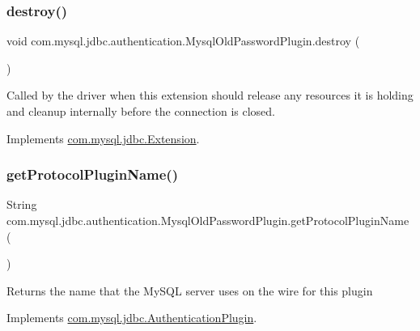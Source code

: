 \subsubsection{\texorpdfstring{destroy()}{destroy()}}
{\footnotesize\ttfamily void com.\+mysql.\+jdbc.\+authentication.\+Mysql\+Old\+Password\+Plugin.\+destroy (\begin{DoxyParamCaption}{ }\end{DoxyParamCaption})}

Called by the driver when this extension should release any resources it is holding and cleanup internally before the connection is closed. 

Implements \mbox{\hyperlink{interfacecom_1_1mysql_1_1jdbc_1_1_extension_a7d9644de305efed5df71f3fcc7cc1772}{com.\+mysql.\+jdbc.\+Extension}}.

\mbox{\label{classcom_1_1mysql_1_1jdbc_1_1authentication_1_1_mysql_old_password_plugin_a06ca40d8d34e31a0c20b7c22b7ceec78}} 
\subsubsection{\texorpdfstring{get\+Protocol\+Plugin\+Name()}{getProtocolPluginName()}}
{\footnotesize\ttfamily String com.\+mysql.\+jdbc.\+authentication.\+Mysql\+Old\+Password\+Plugin.\+get\+Protocol\+Plugin\+Name (\begin{DoxyParamCaption}{ }\end{DoxyParamCaption})}

Returns the name that the My\+S\+QL server uses on the wire for this plugin 

Implements \mbox{\hyperlink{interfacecom_1_1mysql_1_1jdbc_1_1_authentication_plugin_a90dfb5c717939a248527c5bdf512b510}{com.\+mysql.\+jdbc.\+Authentication\+Plugin}}.

\mbox{\label{classcom_1_1mysql_1_1jdbc_1_1authentication_1_1_mysql_old_password_plugin_a4549e60d640445edacfe7187c2e619ef}} 
